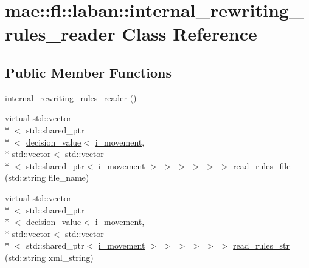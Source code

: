 \hypertarget{classmae_1_1fl_1_1laban_1_1internal__rewriting__rules__reader}{\section{mae\-:\-:fl\-:\-:laban\-:\-:internal\-\_\-rewriting\-\_\-rules\-\_\-reader Class Reference}
\label{classmae_1_1fl_1_1laban_1_1internal__rewriting__rules__reader}
}
\subsection*{Public Member Functions}
\begin{DoxyCompactItemize}
\item 
\hyperlink{classmae_1_1fl_1_1laban_1_1internal__rewriting__rules__reader_a3eeaaa573f8ca0b211acb1bdcfdc1c8b}{internal\-\_\-rewriting\-\_\-rules\-\_\-reader} ()
\item 
virtual std\-::vector\\*
$<$ std\-::shared\-\_\-ptr\\*
$<$ \hyperlink{classmae_1_1fl_1_1laban_1_1decision__value}{decision\-\_\-value}$<$ \hyperlink{classmae_1_1fl_1_1laban_1_1i__movement}{i\-\_\-movement}, \\*
std\-::vector$<$ std\-::vector\\*
$<$ std\-::shared\-\_\-ptr$<$ \hyperlink{classmae_1_1fl_1_1laban_1_1i__movement}{i\-\_\-movement} $>$ $>$ $>$ $>$ $>$ $>$ \hyperlink{classmae_1_1fl_1_1laban_1_1internal__rewriting__rules__reader_a6e5f6930e14f1299614e8c420328bc92}{read\-\_\-rules\-\_\-file} (std\-::string file\-\_\-name)
\item 
virtual std\-::vector\\*
$<$ std\-::shared\-\_\-ptr\\*
$<$ \hyperlink{classmae_1_1fl_1_1laban_1_1decision__value}{decision\-\_\-value}$<$ \hyperlink{classmae_1_1fl_1_1laban_1_1i__movement}{i\-\_\-movement}, \\*
std\-::vector$<$ std\-::vector\\*
$<$ std\-::shared\-\_\-ptr$<$ \hyperlink{classmae_1_1fl_1_1laban_1_1i__movement}{i\-\_\-movement} $>$ $>$ $>$ $>$ $>$ $>$ \hyperlink{classmae_1_1fl_1_1laban_1_1internal__rewriting__rules__reader_a49b7e40cfa02e0ece6a2a62286f8ae56}{read\-\_\-rules\-\_\-str} (std\-::string xml\-\_\-string)
\end{DoxyCompactItemize}
